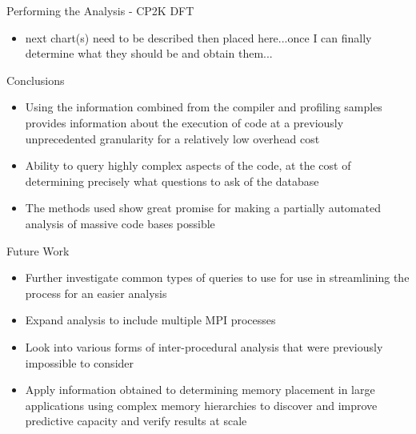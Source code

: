 \documentclass[final]{beamer}
\let\olditem\item
\renewcommand{\item}{\vspace{\fill}\olditem}
\begin{document}
\begin{frame}{\hspace{0.02\paperwidth}Performing the Analysis - CP2K DFT}
\begin{itemize}
\item next chart(s) need to be described then placed here...once I can finally determine what they should be and obtain them...
\end{itemize}
\end{frame}

\begin{frame}{\hspace{0.02\paperwidth}Conclusions}
\begin{itemize}
\item Using the information combined from the compiler and profiling samples provides information about the execution of code at a previously unprecedented granularity for a relatively low overhead cost
\item Ability to query highly complex aspects of the code, at the cost of determining precisely what questions to ask of the database
\item The methods used show great promise for making a partially automated analysis of massive code bases possible
\end{itemize}
\end{frame}

\begin{frame}{\hspace{0.02\paperwidth}Future Work}
\begin{itemize}
\item Further investigate common types of queries to use for use in streamlining the process for an easier analysis
\item Expand analysis to include multiple \acs{MPI} processes
\item Look into various forms of inter-procedural analysis that were previously impossible to consider
\item Apply information obtained to determining memory placement in large applications using complex memory hierarchies to discover and improve predictive capacity and verify results at scale
\end{itemize}
\end{frame}
\end{document}
